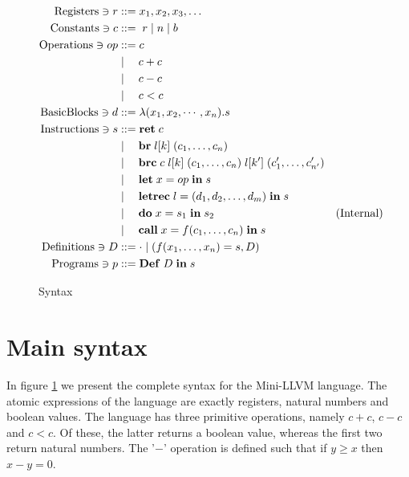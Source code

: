 \documentclass[a4paper, oneside, 10pt, final]{memoir}
\begin{document}
\newcommand{\ibr}[2]{\mathbf{br} \; #1 \; #2}
\newcommand{\ibrc}[5]{\mathbf{brc} \; #1 \; #2 \; #3 \; #4 \; #5}
\newcommand{\ilet}[3]{\mathbf{let} \; #1 = #2 \; \mathbf{in} \; #3}
\newcommand{\iletrec}[3]{\mathbf{letrec} \; #1 = #2 \; \mathbf{in} \; #3}
\newcommand{\ido}[3]{\mathbf{do} \; #1 = #2 \; \mathbf{in} \; #3}
\newcommand{\icall}[4]{\mathbf{call} \; #1 = #2 #3\; \mathbf{in} \;
  #4}
\newcommand{\ipgm}[2]{\mathbf{Def} \; #1 \; \mathbf{in} \; #2}
\begin{figure}
  \begin{align*}
    \registers \ni r & ::= x_1, x_2, x_3, \dotsc\\
    \constants \ni c & ::= \; r \bor \nat \bor \bool \\
    \operations \ni op & ::= c \\
                       & \bor \quad c + c \\
                       & \bor \quad c - c \\
                       & \bor \quad c < c \\
   \basicblocks \ni d  & ::= \lambda (x_1, x_2, \cdots, x_n) . s\\
   \instructions \ni s & ::= \iret{c} \\
                       & \bor \quad \ibr{\lbl{k}}{(c_1, \dotsc, c_n)} \\
                       & \bor \quad \ibrc{c}{\lbl{k}}{(c_1, \dotsc, c_n)}{\lbl{{k'}}}{(c'_1, \dotsc, c'_{n'})}\\
                       & \bor \quad \ilet{x}{op}{s} \\
                       & \bor \quad \iletrec{l}{\dbundle}{s} \\
                       & \bor \quad \ido{x}{s_1}{s_2} &
                       (\text{Internal})\\
                       & \bor \quad \icall{x}{f}{(c_1, \dotsc,
                         c_n)}{s}\\
    \definitions \ni D & ::= \cdot \bor (f(x_1, \dotsc, x_n) = s, D)\\
    \programs \ni p & ::= \ipgm{D}{s}
  \end{align*}
  \caption{Syntax}
  \label{fig:syntax}
\end{figure}

\section{Main syntax}

In figure \ref{fig:syntax} we present the complete syntax for the
Mini-LLVM language. The atomic expressions of the language are exactly
registers, natural numbers and boolean values. The language has three
primitive operations, namely $c + c$, $c - c$ and $c < c$. Of these,
the latter returns a boolean value, whereas the first two return
natural numbers. The '$-$' operation is defined such that if $y \geq
x$ then $x - y = 0$.
\end{document}
